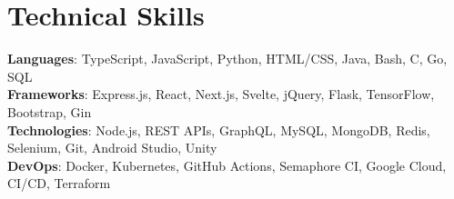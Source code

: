 \section{Technical Skills}
    \begin{itemize}[leftmargin=0.15in, label={}]
	\small{\item{
		\textbf{Languages}{: TypeScript, JavaScript, Python, HTML/CSS, Java, Bash, C, Go, SQL} \\
		\textbf{Frameworks}{: Express.js, React, Next.js, Svelte, jQuery, Flask, TensorFlow, Bootstrap, Gin} \\
		\textbf{Technologies}{: Node.js, REST APIs, GraphQL, MySQL, MongoDB, Redis, Selenium, Git, Android Studio, Unity} \\
		\textbf{DevOps}{: Docker, Kubernetes, GitHub Actions, Semaphore CI, Google Cloud, CI/CD, Terraform}
	}}
    \end{itemize}
